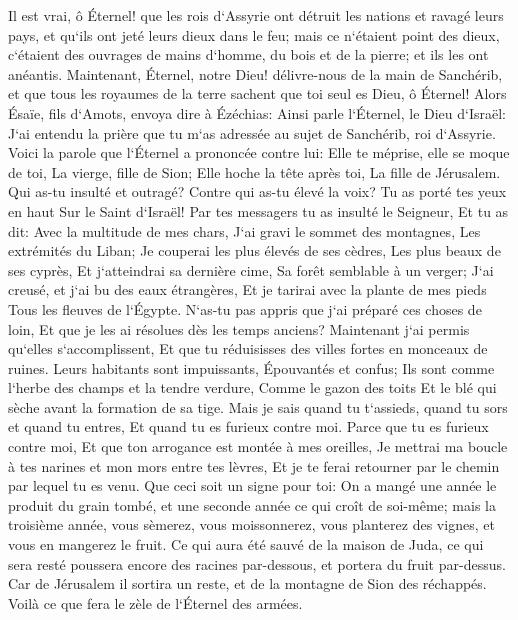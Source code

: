 \verse Il est vrai, ô Éternel! que les rois d`Assyrie ont détruit les nations et ravagé leurs pays, 
\verse et qu`ils ont jeté leurs dieux dans le feu; mais ce n`étaient point des dieux, c`étaient des ouvrages de mains d`homme, du bois et de la pierre; et ils les ont anéantis. 
\verse Maintenant, Éternel, notre Dieu! délivre-nous de la main de Sanchérib, et que tous les royaumes de la terre sachent que toi seul es Dieu, ô Éternel! 
\verse Alors Ésaïe, fils d`Amots, envoya dire à Ézéchias: Ainsi parle l`Éternel, le Dieu d`Israël: J`ai entendu la prière que tu m`as adressée au sujet de Sanchérib, roi d`Assyrie. 
\verse Voici la parole que l`Éternel a prononcée contre lui: Elle te méprise, elle se moque de toi, La vierge, fille de Sion; Elle hoche la tête après toi, La fille de Jérusalem. 
\verse Qui as-tu insulté et outragé? Contre qui as-tu élevé la voix? Tu as porté tes yeux en haut Sur le Saint d`Israël! 
\verse Par tes messagers tu as insulté le Seigneur, Et tu as dit: Avec la multitude de mes chars, J`ai gravi le sommet des montagnes, Les extrémités du Liban; Je couperai les plus élevés de ses cèdres, Les plus beaux de ses cyprès, Et j`atteindrai sa dernière cime, Sa forêt semblable à un verger; 
\verse J`ai creusé, et j`ai bu des eaux étrangères, Et je tarirai avec la plante de mes pieds Tous les fleuves de l`Égypte. 
\verse N`as-tu pas appris que j`ai préparé ces choses de loin, Et que je les ai résolues dès les temps anciens? Maintenant j`ai permis qu`elles s`accomplissent, Et que tu réduisisses des villes fortes en monceaux de ruines. 
\verse Leurs habitants sont impuissants, Épouvantés et confus; Ils sont comme l`herbe des champs et la tendre verdure, Comme le gazon des toits Et le blé qui sèche avant la formation de sa tige. 
\verse Mais je sais quand tu t`assieds, quand tu sors et quand tu entres, Et quand tu es furieux contre moi. 
\verse Parce que tu es furieux contre moi, Et que ton arrogance est montée à mes oreilles, Je mettrai ma boucle à tes narines et mon mors entre tes lèvres, Et je te ferai retourner par le chemin par lequel tu es venu. 
\verse Que ceci soit un signe pour toi: On a mangé une année le produit du grain tombé, et une seconde année ce qui croît de soi-même; mais la troisième année, vous sèmerez, vous moissonnerez, vous planterez des vignes, et vous en mangerez le fruit. 
\verse Ce qui aura été sauvé de la maison de Juda, ce qui sera resté poussera encore des racines par-dessous, et portera du fruit par-dessus. 
\verse Car de Jérusalem il sortira un reste, et de la montagne de Sion des réchappés. Voilà ce que fera le zèle de l`Éternel des armées. 
